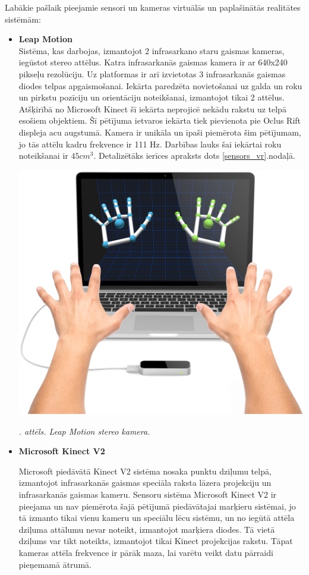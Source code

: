 \documentclass[12pt, a4paper, oneside, openright]{article}
\renewcommand{\thecimages}{\arabic{cimages}}
\begin{document}
\par
Labākie pašlaik pieejamie sensori un kameras virtuālās un paplašinātās realitātes sistēmām:
\begin{itemize}
\item \textbf{Leap Motion} \hfill \\
Sistēma, kas darbojas, izmantojot 2 infrasarkano staru gaismas kameras, iegūstot stereo attēlus.
Katra infrasarkanās gaismas kamera ir ar 640x240 pikseļu rezolūciju. Uz platformas ir arī
izvietotas 3 infrasarkanās gaismas diodes telpas apgaismošanai.
Iekārta paredzēta novietošanai uz galda un roku un pirkstu pozīciju un orientāciju noteikšanai,
izmantojot tikai 2 attēlus. Atšķirībā no Microsoft Kinect šī iekārta neprojicē nekādu rakstu
uz telpā esošiem objektiem. Šī pētījuma ietvaros iekārta tiek pievienota pie Oclus Rift
displeja acu augstumā. Kamera ir unikāla un īpaši piemērota šim pētījumam, jo tās
attēlu kadru frekvence ir 111 Hz. Darbības lauks šai iekārtai roku noteikšanai ir $45cm^3$.
Detalizētāks ierīces apraksts dots \ref{sensors_vr}.nodaļā.

\label{cimages:leap_example}
\vspace{10pt}
\begin{samepage}
\begin{center}
\includegraphics[width=0.5\columnwidth]{images/leap_example.jpg}
\begin{center}
\footnotesize{
\textit{\thecimages. attēls. Leap Motion stereo kamera.}}
\end{center}
\end{center}
\end{samepage}

\item \textbf{Microsoft Kinect V2} \hfill \\

\par
Microsoft piedāvātā Kinect V2 sistēma nosaka punktu dziļumu telpā, izmantojot infrasarkanās
gaismas speciāla raksta lāzera projekciju un infrasarkanās gaismas kameru.
Sensoru sistēma Microsoft Kinect V2 ir pieejama un nav piemērota šajā pētījumā piedāvātajai
marķieru sistēmai, jo tā izmanto tikai vienu kameru un speciālu lēcu sistēmu,
un no iegūtā attēla dziļuma attālumu nevar noteikt, izmantojot marķiera diodes. Tā vietā
dziļums var tikt noteikts, izmantojot tikai Kinect projekcijas rakstu. Tāpat kameras 
attēla frekvence ir pārāk maza, lai varētu veikt datu pārraidi pieņemamā ātrumā.\\


\end{itemize}
\end{document}
